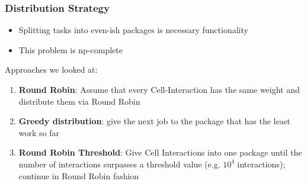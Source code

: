 \begin{frame}
	\frametitle{Distribution Strategy}
	\large
	\begin{itemize}
		\item Splitting tasks into even-ish packages is necessary functionality
		\item This problem is np-complete
	\end{itemize}
	
	Approaches we looked at:
	\begin{enumerate}
		\setlength\itemsep{1em}
		\item<2-> \textbf{Round Robin}: Assume that every Cell-Interaction has the same weight and distribute them via Round Robin
		\item<3-> \textbf{Greedy distribution}: give the next job to the package that has the least work so far
		\item<4-> \textbf{Round Robin Threshold}: Give Cell Interactions into one package until the number of interactions surpasses a threshold value (e.g. $10^{4}$ interactions); continue in Round Robin fashion
	\end{enumerate}
\end{frame}
	

